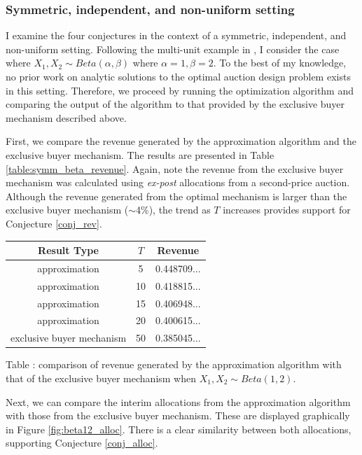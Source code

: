 \subsubsection{Symmetric, independent, and non-uniform setting}

I examine the four conjectures in the context of a symmetric, independent, and non-uniform setting. Following the multi-unit example in \autocite{daskalakis2017strong}, I consider the case where $X_1,X_2 \sim Beta(\alpha,\beta)$ where $\alpha=1,\beta=2$. To the best of my knowledge, no prior work on analytic solutions to the optimal auction design problem exists in this setting. Therefore, we proceed by running the optimization algorithm and comparing the output of the algorithm to that provided by the exclusive buyer mechanism described above.

First, we compare the revenue generated by the approximation algorithm and the exclusive buyer mechanism. The results are presented in Table \ref{table:symm_beta_revenue}. Again, note the revenue from the exclusive buyer mechanism was calculated using \textit{ex-post} allocations from a second-price auction. Although the revenue generated from the optimal mechanism is larger than the exclusive buyer mechanism ($\sim$4\%), the trend as $T$ increases provides support for Conjecture \ref{conj_rev}.

\begin{center}
    \begin{tabular}{ |c|c|c| } 
    \hline
    Result Type & $T$ & Revenue \\
    \hline
    \hline
    approximation & 5 & 0.448709... \\ 
    approximation & 10 & 0.418815... \\ 
    approximation & 15 & 0.406948... \\ 
    approximation & 20 & 0.400615... \\ 
    exclusive buyer mechanism & 50 & 0.385045... \\
    \hline
    \end{tabular}

    \vspace{1mm}
    \raggedright{\small {\sc Table \thefig\label{table:symm_beta_revenue}:} comparison of revenue generated by the approximation algorithm with that of the exclusive buyer mechanism when $X_1,X_2 \sim Beta(1,2)$.}
\end{center}

Next, we can compare the interim allocations from the approximation algorithm with those from the exclusive buyer mechanism. These are displayed graphically in Figure \ref{fig:beta12_alloc}. There is a clear similarity between both allocations, supporting Conjecture \ref{conj_alloc}.

